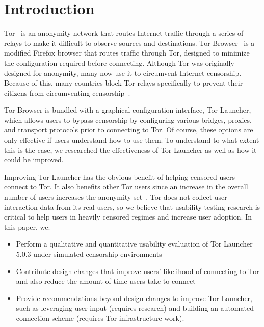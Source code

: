 \documentclass[USenglish,oneside,twocolumn]{article}
\begin{document}


\maketitle

\section{Introduction}
Tor~\cite{dingledine2004tor} is an anonymity network that routes Internet traffic through a series of relays 
to make it difficult to observe sources and destinations.
Tor Browser~\cite{torbrowser} is a modified Firefox browser that routes traffic through Tor, designed to minimize the configuration required before connecting.
Although Tor was originally designed for anonymity, many now use it to circumvent Internet censorship.
Because of this, many countries block Tor relays specifically to prevent their citizens from circumventing censorship~\cite{winter2012great}.

Tor Browser is bundled with a graphical configuration interface, Tor Launcher, which allows users to bypass censorship by configuring various bridges, proxies, and transport protocols prior to connecting to Tor.
Of course, these options are only effective if users understand how to use them.
To understand to what extent this is the case, we researched the effectiveness of Tor Launcher as well as how it could be improved.

Improving Tor Launcher has the obvious benefit of helping censored users connect to Tor. It also benefits other Tor users since an increase in the overall number of users increases the anonymity set~\cite{dingledine2006anonymity}. Tor does not collect user interaction data from its real users, so we believe that usability testing research is critical to help users in heavily censored regimes and increase user adoption. In this paper, we: \\ 

\begin{itemize}
\item{Perform a qualitative and quantitative usability evaluation of Tor Launcher 5.0.3  under simulated censorship environments}
\item{Contribute design changes that improve users' likelihood of connecting to Tor and also reduce the amount of time users take to connect}
\item{Provide recommendations beyond design changes to improve Tor Launcher, such as leveraging user input (requires research) and building an automated connection scheme (requires Tor infrastructure work).}
\end{itemize} 
\end{document}

